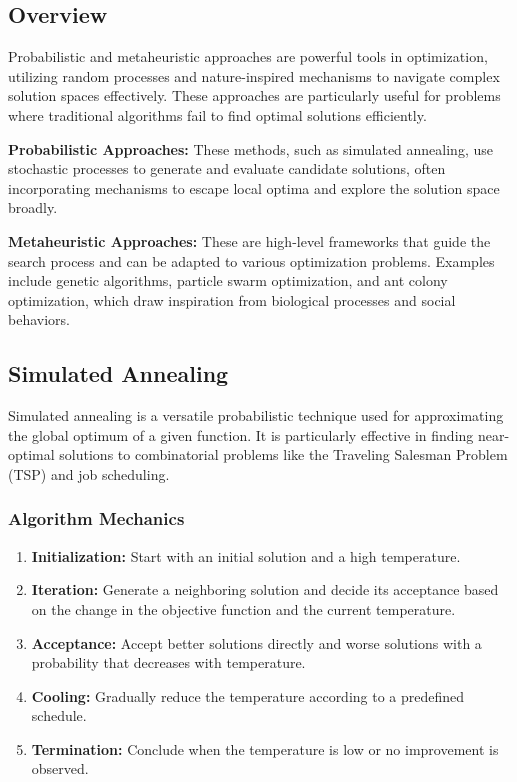 \documentclass[12pt]{book} %
\begin{document}
\subsection{Overview}

Probabilistic and metaheuristic approaches are powerful tools in optimization, utilizing random processes and nature-inspired mechanisms to navigate complex solution spaces effectively. These approaches are particularly useful for problems where traditional algorithms fail to find optimal solutions efficiently.

\textbf{Probabilistic Approaches:} These methods, such as simulated annealing, use stochastic processes to generate and evaluate candidate solutions, often incorporating mechanisms to escape local optima and explore the solution space broadly.

\textbf{Metaheuristic Approaches:} These are high-level frameworks that guide the search process and can be adapted to various optimization problems. Examples include genetic algorithms, particle swarm optimization, and ant colony optimization, which draw inspiration from biological processes and social behaviors.

\subsection{Simulated Annealing}

Simulated annealing is a versatile probabilistic technique used for approximating the global optimum of a given function. It is particularly effective in finding near-optimal solutions to combinatorial problems like the Traveling Salesman Problem (TSP) and job scheduling.

\subsubsection{Algorithm Mechanics}

\begin{enumerate}
    \item \textbf{Initialization:} Start with an initial solution and a high temperature.
    \item \textbf{Iteration:} Generate a neighboring solution and decide its acceptance based on the change in the objective function and the current temperature.
    \item \textbf{Acceptance:} Accept better solutions directly and worse solutions with a probability that decreases with temperature.
    \item \textbf{Cooling:} Gradually reduce the temperature according to a predefined schedule.
    \item \textbf{Termination:} Conclude when the temperature is low or no improvement is observed.
\end{enumerate}
\end{document}
